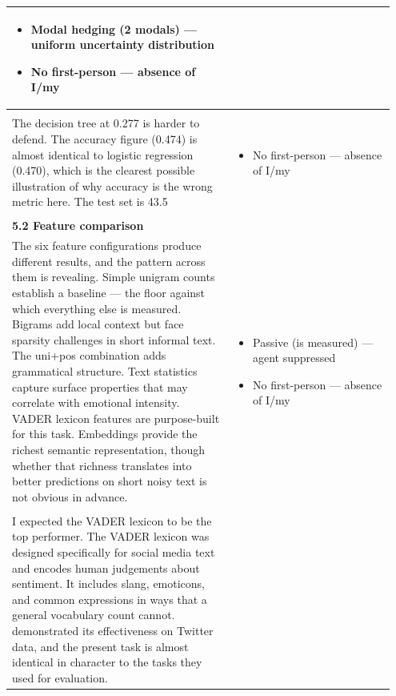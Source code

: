 \documentclass[11pt]{article}
\begin{document}
\begin{longtable}{|p{0.55\linewidth}|p{0.40\linewidth}|}
\begin{itemize}[leftmargin=1em,itemsep=1pt,topsep=1pt,parsep=0pt]
  \item Modal hedging (2 modals) --- uniform uncertainty distribution
  \item No first-person --- absence of I/my
\end{itemize} \\[2pt]
\hline
\rule[-3.5cm]{0pt}{3.5cm} & \\
\hline
The decision tree at 0.277 is harder to defend. The accuracy figure (0.474) is almost identical to logistic regression (0.470), which is the clearest possible illustration of why accuracy is the wrong metric here. The test set is 43.5 & \begin{itemize}[leftmargin=1em,itemsep=1pt,topsep=1pt,parsep=0pt]
  \item No first-person --- absence of I/my
\end{itemize} \\[2pt]
\hline
\rule[-3.5cm]{0pt}{3.5cm} & \\
\hline
\textbf{5.2 Feature comparison}\\[4pt]
The six feature configurations produce different results, and the pattern across them is revealing. Simple unigram counts establish a baseline --- the floor against which everything else is measured. Bigrams add local context but face sparsity challenges in short informal text. The uni+pos combination adds grammatical structure. Text statistics capture surface properties that may correlate with emotional intensity. VADER lexicon features are purpose-built for this task. Embeddings provide the richest semantic representation, though whether that richness translates into better predictions on short noisy text is not obvious in advance. & \begin{itemize}[leftmargin=1em,itemsep=1pt,topsep=1pt,parsep=0pt]
  \item Passive (is measured) --- agent suppressed
  \item No first-person --- absence of I/my
\end{itemize} \\[2pt]
\hline
\rule[-3.5cm]{0pt}{3.5cm} & \\
\hline
I expected the VADER lexicon to be the top performer. The VADER lexicon was designed specifically for social media text and encodes human judgements about sentiment. It includes slang, emoticons, and common expressions in ways that a general vocabulary count cannot. demonstrated its effectiveness on Twitter data, and the present task is almost identical in character to the tasks they used for evaluation. & \begin{itemize}[leftmargin=1em,itemsep=1pt,topsep=1pt,parsep=0pt]

\end{itemize}
\end{longtable}
\end{document}
